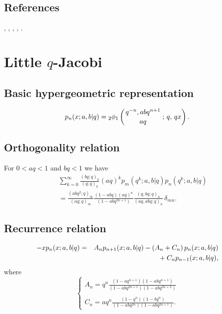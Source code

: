 \documentclass[envcountchap,graybox]{svmono}
\newcommand{\qhyp}[5]{\mbox{}_{#1}{\phi}_{#2}
\left(\genfrac{}{}{0pt}{}{#3}{#4}\,;\,q,\,#5\right)}
\newcommand{\mathindent}{\hspace{7.5mm}}
\begin{document}
\subsection*{References}
\cite{AlSalam90}, \cite{AlSalamVerma88}, \cite{AtakAtakKlimyk}, \cite{DattaGriffin},
\cite{IsmailLibis}.


\section{Little $q$-Jacobi}
\par\setcounter{equation}{0}

\subsection*{Basic hypergeometric representation}
\begin{equation}
\label{DefLittleqJacobi}
p_n(x;a,b|q)=\qhyp{2}{1}{q^{-n},abq^{n+1}}{aq}{qx}.
\end{equation}

\subsection*{Orthogonality relation}
For $0<aq<1$ and $bq<1$ we have
\begin{eqnarray}
\label{OrtLittleqJacobi}
& &\sum_{k=0}^{\infty}\frac{(bq;q)_k}{(q;q)_k}(aq)^kp_m(q^k;a,b|q)p_n(q^k;a,b|q)\nonumber\\
& &{}=\frac{(abq^2;q)_{\infty}}{(aq;q)_{\infty}}\frac{(1-abq)(aq)^n}{(1-abq^{2n+1})}
\frac{(q,bq;q)_n}{(aq,abq;q)_n}\,\delta_{mn}.
\end{eqnarray}

\subsection*{Recurrence relation}
\begin{eqnarray}
\label{RecLittleqJacobi}
-xp_n(x;a,b|q)&=&A_np_{n+1}(x;a,b|q)-\left(A_n+C_n\right)p_n(x;a,b|q)\nonumber\\
& &{}\mathindent{}+C_np_{n-1}(x;a,b|q),
\end{eqnarray}
where
$$\left\{\begin{array}{l}
\displaystyle A_n=q^n\frac{(1-aq^{n+1})(1-abq^{n+1})}{(1-abq^{2n+1})(1-abq^{2n+2})}\\
\\
\displaystyle C_n=aq^n\frac{(1-q^n)(1-bq^n)}{(1-abq^{2n})(1-abq^{2n+1})}.
\end{array}\right.$$
\end{document}
